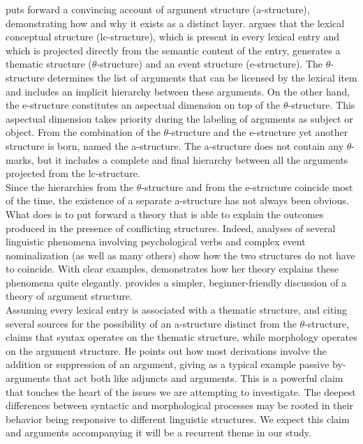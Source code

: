 \documentclass[11pt]{article} %
\begin{document}
\citet{Grimshaw1990} puts forward a convincing account of argument structure (a-structure), demonstrating how and why it exists as a distinct layer. \citet{Grimshaw1990} argues that the lexical conceptual structure (lc-structure), which is present in every lexical entry and which is projected directly from the semantic content of the entry, generates a thematic structure ($\theta$-structure) and an event structure (e-structure). The $\theta$-structure determines the list of arguments that can be licensed by the lexical item and includes an implicit hierarchy between these arguments. On the other hand, the e-structure constitutes an aspectual dimension on top of the $\theta$-structure. This aspectual dimension takes priority during the labeling of arguments as subject or object. From the combination of the $\theta$-structure and the e-structure yet another structure is born, named the a-structure. The a-structure does not contain any $\theta$-marks, but it includes a complete and final hierarchy between all the arguments projected from the lc-structure. \\

Since the hierarchies from the $\theta$-structure and from the e-structure coincide most of the time, the existence of a separate a-structure has not always been obvious. What \citet{Grimshaw1990} does is to put forward a theory that is able to explain the outcomes produced in the presence of conflicting structures. Indeed, analyses of several linguistic phenomena involving psychological verbs and complex event nominalization (as well as many others) show how the two structures do not have to coincide. With clear examples, \citet{Grimshaw1990} demonstrates how her theory explains these phenomena quite elegantly. \citet{HaleKeyser2002} provides a simpler, beginner-friendly discussion of a theory of argument structure. \\

Assuming every lexical entry is associated with a thematic structure, and citing several sources for the possibility of an a-structure distinct from the $\theta$-structure, \citet{Sezer1991} claims that syntax operates on the thematic structure, while morphology operates on the argument structure. He points out how most derivations involve the addition or suppression of an argument, giving as a typical example passive by-arguments that act both like adjuncts and arguments. This is a powerful claim that touches the heart of the issues we are attempting to investigate. The deepest differences between syntactic and morphological processes may be rooted in their behavior being responsive to different linguistic structures. We expect this claim and arguments accompanying it will be a recurrent theme in our study. \\
\end{document}
